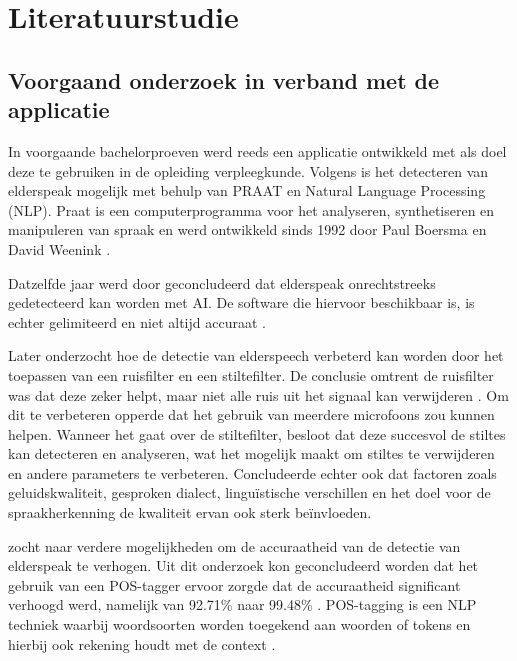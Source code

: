 \section{Literatuurstudie}%
\label{sec:literatuurstudie}

\subsection{Voorgaand onderzoek in verband met de applicatie}%

In voorgaande bachelorproeven werd reeds een applicatie ontwikkeld met als doel deze te gebruiken in de opleiding verpleegkunde. Volgens \textcite{Govaerts2022} is het detecteren van elderspeak mogelijk met behulp van PRAAT en Natural Language Processing (NLP). Praat is een computerprogramma voor het analyseren, synthetiseren en manipuleren van spraak en werd ontwikkeld sinds 1992 door Paul Boersma en David Weenink \autocite{Govaerts2022}.

Datzelfde jaar werd door \textcite{Gussem2022} geconcludeerd dat elderspeak onrechtstreeks gedetecteerd kan worden met AI. De software die hiervoor beschikbaar is, is echter gelimiteerd en niet altijd accuraat \autocite{Gussem2022}.

Later onderzocht \textcite{Daems2023} hoe de detectie van elderspeech verbeterd kan worden door het toepassen van een ruisfilter en een stiltefilter. De conclusie omtrent de ruisfilter was dat deze zeker helpt, maar niet alle ruis uit het signaal kan verwijderen \autocite{Daems2023}. Om dit te verbeteren opperde \textcite{Daems2023} dat het gebruik van meerdere microfoons zou kunnen helpen.
Wanneer het gaat over de stiltefilter, besloot \textcite{Daems2023} dat deze succesvol de stiltes kan detecteren en analyseren, wat het mogelijk maakt om stiltes te verwijderen en andere parameters te verbeteren. \textcite{Daems2023} Concludeerde echter ook dat factoren zoals geluidskwaliteit, gesproken dialect, linguïstische verschillen en het doel voor de spraakherkenning de kwaliteit ervan ook sterk beïnvloeden.

\textcite{Branden2024} zocht naar verdere mogelijkheden om de accuraatheid van de detectie van elderspeak te verhogen. Uit dit onderzoek kon geconcludeerd worden dat het gebruik van een POS-tagger ervoor zorgde dat de accuraatheid significant verhoogd werd, namelijk van 92.71\% naar 99.48\% \autocite{Branden2024}. POS-tagging is een NLP techniek waarbij woordsoorten worden toegekend aan woorden of tokens en hierbij ook rekening houdt met de context \autocite{Branden2024}.

